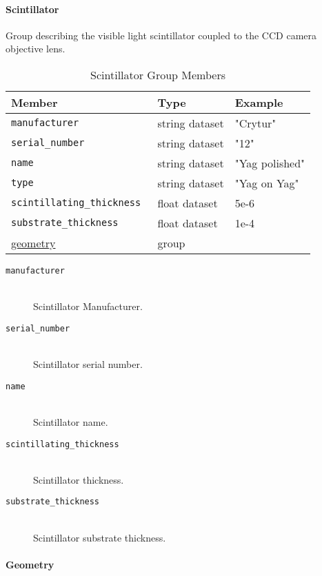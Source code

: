 \paragraph{Scintillator}
\label{table:scintillator}

Group describing the visible light scintillator coupled to the CCD camera objective lens.

\begin{table}[h!]\sffamily \footnotesize
\caption{Scintillator Group Members}
\centering
{}
\begin{tabular}{l l l}
\toprule
\bfseries Member     & \bfseries Type & \bfseries Example \\
\midrule
\tt{manufacturer} & string dataset & "Crytur" \\
\tt{serial\_number} & string dataset &  "12" \\   
\tt{name} & string dataset & "Yag polished" \\ 
\tt{type} & string dataset & "Yag on Yag" \\  
\tt{scintillating\_thickness} & float dataset &  5e-6 \\  
\tt{substrate\_thickness} & float dataset &   1e-4\\  
\hyperref[tomo:geometry]{geometry} &  group & \\
\bottomrule
\end{tabular}
\end{table}

\begin{description}
\item[\tt{manufacturer}] \hfill \\
{Scintillator Manufacturer.}

\item[\tt{serial\_number}] \hfill \\
{Scintillator serial number.}

\item[\tt{name}] \hfill \\
{Scintillator name.}

\item[\tt{scintillating\_thickness}] \hfill \\
{Scintillator thickness.}

\item[\tt{substrate\_thickness}] \hfill \\
{Scintillator substrate thickness.}
\end{description}

\paragraph{Geometry}
\label{tomo:geometry}

